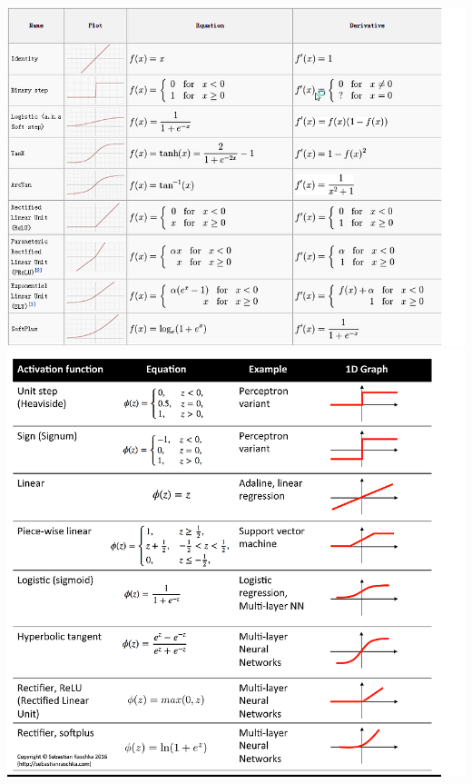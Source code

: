 \documentclass{beamer}
\begin{document}
\begin{frame}[allowframebreaks]
	\includegraphics[scale=0.265]{DNN/activationf}
	\includegraphics[scale=0.22]{DNN/activationfuses}

\end{frame}
\end{document}
